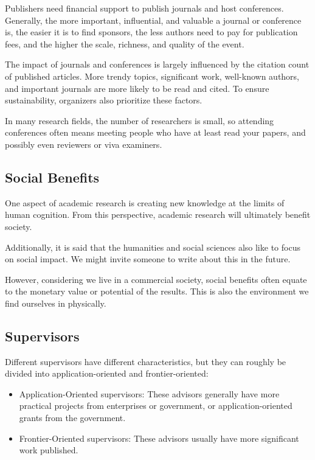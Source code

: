 Publishers need financial support to publish journals and host conferences. Generally, the more important, influential, and valuable a journal or conference is, the easier it is to find sponsors, the less authors need to pay for publication fees, and the higher the scale, richness, and quality of the event.

The impact of journals and conferences is largely influenced by the citation count of published articles. More trendy topics, significant work, well-known authors, and important journals are more likely to be read and cited. To ensure sustainability, organizers also prioritize these factors.

In many research fields, the number of researchers is small, so attending conferences often means meeting people who have at least read your papers, and possibly even reviewers or viva examiners.


\subsection{Social Benefits}
One aspect of academic research is creating new knowledge at the limits of human cognition. From this perspective, academic research will ultimately benefit society.

Additionally, it is said that the humanities and social sciences also like to focus on social impact. We might invite someone to write about this in the future.

However, considering we live in a commercial society, social benefits often equate to the monetary value or potential of the results. This is also the environment we find ourselves in physically.


\subsection{Supervisors}
Different supervisors have different characteristics, but they can roughly be divided into application-oriented and frontier-oriented:
\begin{itemize}
    \item Application-Oriented supervisors: These advisors generally have more practical projects from enterprises or government, or application-oriented grants from the government.
    \item Frontier-Oriented supervisors: These advisors usually have more significant work published.
\end{itemize}

\vspace{\baselineskip}

